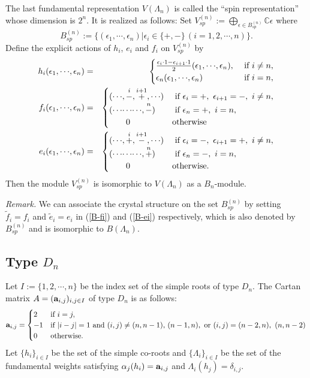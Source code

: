 The last fundamental representation $V({\Lambda}_n)$ 
is called the ``spin representation'' whose dimension
is $2^n$. It is realized as follows:
Set $V^{(n)}_{sp}:=\bigoplus_{{\epsilon}\in B^{(n)}_{sp}}{\mathbb C}{\epsilon}$ where
\[
 B^{(n)}_{sp}:=\{({\epsilon}_1,{\cdots},{\epsilon}_n)|{\epsilon}_i\in\{+,-\}\,(i=1,2,{\cdots},n)\}.
\]
Define the explicit actions of $h_i$, $e_i$ and $f_i$ on 
$V^{(n)}_{sp}$ by 
\begin{eqnarray}
h_i({\epsilon}_1,{\cdots},{\epsilon}_n)&=&\begin{cases}
\frac{{\epsilon}_i\cdot1-{\epsilon}_{i+1}\cdot1}{2}
({\epsilon}_1,{\cdots},{\epsilon}_n),&\text{ if }i\ne n,\\
{\epsilon}_n({\epsilon}_1,{\cdots},{\epsilon}_n)&\text{ if }i=n,
\end{cases}\\
f_i({\epsilon}_1,{\cdots},{\epsilon}_n)&=&\begin{cases}
({\cdots},\buildrel{i}\over-,\buildrel{i+1}\over+,{\cdots})
&\text{ if }{\epsilon}_i=+,\,\,{\epsilon}_{i+1}=-,\,\,
i\ne n,\\
({\cdots}{\cdots}{\cdots},\buildrel{n}\over-)
&\text{ if }{\epsilon}_n=+,\,\,i=n,\\
{\qquad}0&\text{otherwise}
\end{cases}
\label{B-fi}
\\
e_i({\epsilon}_1,{\cdots},{\epsilon}_n)&=&\begin{cases}
({\cdots},\buildrel{i}\over+,\buildrel{i+1}\over-,{\cdots})
&\text{ if }{\epsilon}_i=-,\,\,{\epsilon}_{i+1}=+,\,\,
i\ne n,\\
({\cdots}{\cdots}{\cdots},\buildrel{n}\over+)
&\text{ if }{\epsilon}_n=-,\,\,i=n,\\
{\qquad}0&\text{otherwise.}
\end{cases}
\label{B-ei}
\end{eqnarray}
Then the module $V^{(n)}_{sp}$ is isomorphic to 
$V({\Lambda}_n)$ as a $B_n$-module.

{\sl Remark.}
We can associate the crystal structure on the set $B^{(n)}_{sp}$ by 
setting ${\tilde{f}_i}=f_i$ and ${\tilde{e}_i}=e_i$ in (\ref{B-fi}) and (\ref{B-ei})
respectively, which is also denoted by $B^{(n)}_{sp}$ and is isomorphic
to $B({\Lambda}_n)$.

\subsection{Type $D_n$}\label{Dn}

Let $I:=\{1,2,{\cdots},n\}$ be the index set of the 
simple roots of type $D_n$. The Cartan matrix 
$A=({\bf a}_{i,j})_{i,j\in I}$ of type 
$D_n$ is as follows:
\[
 {\bf a}_{i,j}=\begin{cases}
2&\text{if }i=j,\\
-1&\text{if }|i-j|=1
\text{ and }(i,j)\ne(n,n-1),\,(n-1,n), 
\text{ or }(i,j)=(n-2,n),\,\,(n,n-2)\\
0&\text{otherwise}.
\end{cases}
\]
Let $\{h_i\}_{i\in I}$ be the set of the simple co-roots
and $\{{\Lambda}_i\}_{i\in I}$ be the set of the fundamental 
weights satisfying ${\alpha}_j(h_i)={\bf a}_{i,j}$ 
and ${\Lambda}_i(h_j)={\delta}_{i,j}$.

